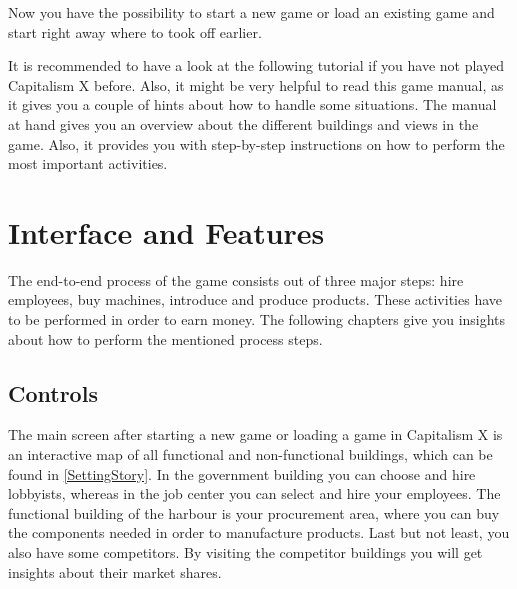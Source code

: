 \documentclass[11pt,titlepage,oneside,openany]{book}
\begin{document}
Now you have the possibility to start a new game or load an existing game and start right away where to took off earlier. %

It is recommended to have a look at the following tutorial if you have not played Capitalism X before. Also, it might be very helpful to read this game manual, as it gives you a couple of hints about how to handle some situations. The manual at hand gives you an overview about the different buildings and views in the game. Also, it provides you with step-by-step instructions on how to perform the most important activities.

\section{Interface and Features}
The end-to-end process of the game consists out of three major steps: hire employees, buy machines, introduce and produce products. These activities have to be performed in order to earn money. The following chapters give you insights about how to perform the mentioned process steps.

\subsection{Controls}  
The main screen after starting a new game or loading a game in Capitalism X is an interactive map of all functional and non-functional buildings, which can be found in \ref{SettingStory}. In the government building you can choose and hire lobbyists, whereas in the job center you can select and hire your employees. The functional building of the harbour is your procurement area, where you can buy the components needed in order to manufacture products. Last but not least, you also have some competitors. By visiting the competitor buildings you will get insights about their market shares.
\end{document}
